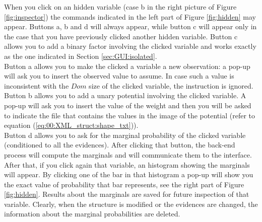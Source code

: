 When you click on an hidden variable (case b in the right picture of Figure \ref{fig:inspector}) the commands indicated in the left part of Figure \ref{fig:hidden} may appear. Buttons a, b and d will always appear, while button c will appear only in the case that you have previously clicked another hidden variable. Button c allows you to add a binary factor involving the clicked variable and works exactly as the one indicated in Section \ref{sec:GUI:isolated}.
\\
Button a allows you to make the clicked a variable a new observation: a pop-up will ask you to insert the observed value to assume. In case such a value is inconsistent with the $Dom$ size of the clicked variable, the instruction is ignored. 
\\
Button b allows you to add a unary potential involving the clicked variable. A pop-up will ask you to insert the value of the weight and then you will be asked to indicate the file that contains the values in the image of the potential (refer to equation (\ref{eq:00:XML_struct:shape_txt})).
\\
Button d allows you to ask for the marginal probability of the clicked variable (conditioned to all the evidences). After clicking that button, the back-end process will compute the marginals and will communicate them to the interface. After that, if you click again that variable, an histogram showing the marginals will appear. By clicking one of the bar in that histogram a pop-up will show you the exact value of probability that bar represents, see the right part of Figure \ref{fig:hidden}. Results about the marginals are saved for future inspection of that variable. Clearly, when the structure is modified or the evidences are changed, the information about the marginal probabilities are deleted.


